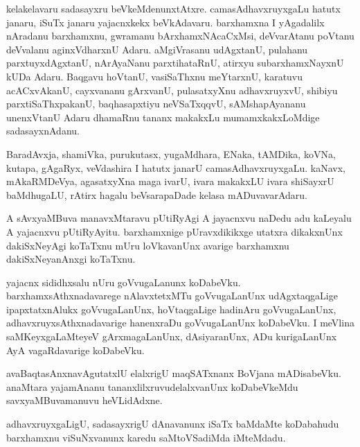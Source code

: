 \begin{mng}
kelakelavaru sadasayxru beVkeMdenunxtAtxre. camasAdhavxruyxgaLu hatutx janaru, iSuTx janaru yajacnxkekx beVkAdavaru. barxhamxna I yAgadalilx nAradanu barxhamxnu, gwramanu bArxhamxNAcaCxMsi, deVvarAtanu poVtanu deVvalanu aginxVdharxnU Adaru. aMgiVrasanu udAgxtanU, pulahanu parxtuyxdAgxtanU, nArAyaNanu parxtihataRnU, atirxyu subarxhamxNayxnU kUDa Adaru. Baqgavu hoVtanU, vasiSaThxnu meYtarxnU, karatuvu acACxvAkanU, cayxvananu gArxvanU, pulasatxyXnu adhavxruyxvU, shibiyu parxtiSaThxpakanU, baqhasapxtiyu neVSaTxqqvU, sAMshapAyananu unenxVtanU Adaru dhamaRnu tananx makakxLu mumamxkakxLoMdige sadasayxnAdanu.
\end{mng}

\begin{mng}
BaradAvxja, shamiVka, purukutasx, yugaMdhara, ENaka, tAMDika, koVNa, kutapa, gAgaRyx, veVdashira I hatutx janarU camasAdhavxruyxgaLu. kaNavx, mAkaRMDeVya, agasatxyXna maga ivarU, ivara makakxLU ivara shiSayxrU baMdhugaLU, rAtirx hagalu beVsarapaDade kelasa mADuvavarAdaru.
\end{mng}

\begin{mng}
A sAvxyaMBuva manavxMtaravu pUtiRyAgi A jayacnxvu naDedu adu kaLeyalu A yajacnxvu pUtiRyAyitu. barxhamxnige pUravxdikikxge utatxra dikakxnUnx dakiSxNeyAgi koTaTxnu mUru loVkavanUnx avarige barxhamxnu dakiSxNeyanAnxgi koTaTxnu.
\end{mng}

\begin{mng}
yajacnx sididhxsalu nUru goVvugaLanunx koDabeVku. barxhamxsAthxnadavarege nAlavxtetxMTu goVvugaLanUnx udAgxtaqgaLige ipapxtatxnAlukx goVvugaLanUnx, hoVtaqgaLige hadinAru goVvugaLanUnx, adhavxruyxsAthxnadavarige hanenxraDu goVvugaLanUnx koDabeVku. I meVlina saMKeyxgaLaMteyeV gArxmagaLanUnx, dAsiyaranUnx, ADu kurigaLanUnx AyA vagaRdavarige koDabeVku.
\end{mng}

\begin{mng}
avaBaqtasAnxnavAgutatxlU elalxrigU maqSATxnanx BoVjana mADisabeVku. anaMtara yajamAnanu tananxlilxruvudelalxvanUnx koDabeVkeMdu savxyaMBuvamanuvu heVLidAdxne.
\end{mng}

\begin{mng}
adhavxruyxgaLigU, sadasayxrigU dAnavanunx iSaTx baMdaMte koDabahudu barxhamxnu viSuNxvanunx karedu saMtoVSadiMda iMteMdadu.
\end{mng}

